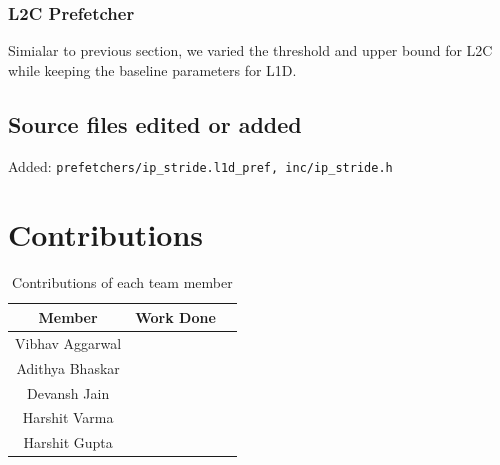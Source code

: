 \documentclass[11pt, swedish, openany]{book}
\begin{document}
\subsection{L2C Prefetcher}
Simialar to previous section, we varied the threshold and upper bound for L2C while keeping the baseline parameters for L1D.
\section{Source files edited or added}
Added: \texttt{prefetchers/ip\_stride.l1d\_pref, inc/ip\_stride.h}

\chapter{Contributions}
 {\renewcommand{\arraystretch}{1.2}  %
  \begin{table}[h]
    \centering
    \begin{tabular}{|c|c|p{6cm}|}
      \hline
      \textbf{Member} & \textbf{Work Done} \\
      \hline
      \hline
      Vibhav Aggarwal &                    \\
      Adithya Bhaskar &                    \\
      Devansh Jain    &                    \\
      Harshit Varma   &                    \\
      Harshit Gupta   &                    \\
      \hline
    \end{tabular}
    \caption{Contributions of each team member}
  \end{table}}
\end{document}
